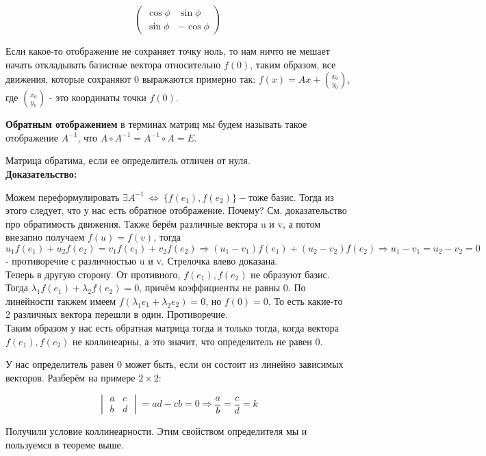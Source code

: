 \documentclass[12pt]{article}
\begin{document}
\begin{theorembox}
    \[
        \begin{pmatrix}
            \cos{\phi} & \sin{\phi}\\
            \sin{\phi} & -\cos{\phi}
        \end{pmatrix}
    \]

    Если какое-то отображение не сохраняет точку ноль, то нам ничто не мешает начать откладывать базисные вектора относительно $f(0)$, таким образом, все движения, которые сохраняют 0 выражаются примерно так: $f(x) = Ax + \binom{x_0}{y_0}$, где $\binom{x_0}{y_0}$ - это координаты точки $f(0)$.
\end{theorembox}

\begin{definitionbox}
    \textbf{Обратным отображением} в терминах матриц мы будем называть такое отображение $A^{-1}$, что $A \circ A^{-1} =  A^{-1} \circ A = E$.
\end{definitionbox}

\begin{theorembox}
    Матрица обратима, если ее определитель отличен от нуля.\\

    \textbf{Доказательство:}

    Можем переформулировать $\exists A^{-1} \ \Leftrightarrow \ \{f(e_1), f(e_2)\} - \text{тоже базис}$. Тогда из этого следует, что у нас есть обратное отображение. Почему? См. доказательство про обратимость движения. Также берём различные вектора u и v, а потом внезапно получаем $f(u) = f(v)$, тогда $u_1f(e_1) + u_2f(e_2) = v_1f(e_1) + v_2f(e_2) \Rightarrow (u_1 - v_1)f(e_1) + (u_2 - v_2)f(e_2) \Rightarrow u_1 - v_1 = u_2 - v_2 = 0$ - противоречие с различностью u и v. Стрелочка влево доказана.\\

    Теперь в другую сторону. От противного, $f(e_1), f(e_2)$ не образуют базис. Тогда $\lambda_1 f(e_1) + \lambda_2 f(e_2) = 0$, причём коэффициенты не равны 0. По линейности такжем имеем $f(\lambda_1 e_1 + \lambda_2 e_2) = 0$, но $f(0) = 0$. То есть какие-то 2 различных вектора перешли в один. Противоречие.\\

    Таким образом у нас есть обратная матрица тогда и только тогда, когда вектора $f(e_1), f(e_2)$ не коллинеарны, а это значит, что определитель не равен 0.
\end{theorembox}

\begin{remarkbox}
    У нас определитель равен 0 может быть, если он состоит из линейно зависимых векторов. Разберём на примере $2 \times 2$:

    \[
        \begin{vmatrix}
        a & c\\
        b & d
        \end{vmatrix} = ad - cb = 0 \Rightarrow \frac{a}{b} = \frac{c}{d} = k
    \]

    Получили условие коллинеарности. Этим свойством определителя мы и пользуемся в теореме выше.
\end{remarkbox}
\end{document}
